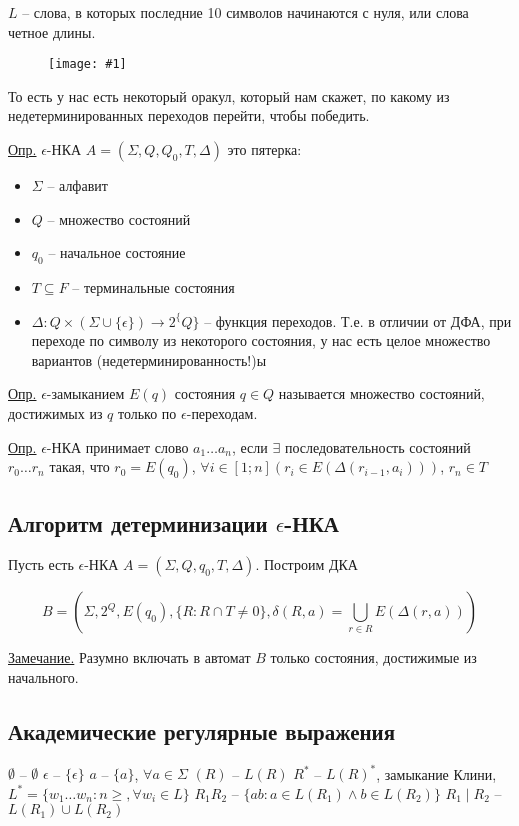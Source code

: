 \documentclass[fleqn, 12pt]{article}
\newcommand{\lr}[1]{\left({#1}\right)}
\newcommand{\image}[2] { \begin{figure}[h!] \centering	\texttt{[image: \#1]}  \end{figure} }
\begin{document}
$ L $ -- слова, в которых последние 10 символов начинаются с нуля, или слова четное длины.

\image{img7.png}{0.5}

То есть у нас есть некоторый оракул, который нам скажет, по какому из недетерминированных переходов перейти, чтобы победить. 

\underline{Опр.} $ \epsilon $-НКА $ A = (\Sigma, Q, Q_0, T, \Delta) $ это пятерка:

\begin{itemize}
	\item $ \Sigma $ -- алфавит
	
	\item $ Q $ -- множество состояний
	
	\item $q_0$ -- начальное состояние
	
	\item $ T \subseteq F $ -- терминальные состояния
	
	\item $ \Delta \colon Q \times (\Sigma \cup \{ \epsilon \}) \to 2^\{Q\} $ -- функция переходов. Т.е. в отличии от ДФА, при переходе по символу из некоторого состояния, у нас есть целое множество вариантов (недетерминированность!)ы
\end{itemize}

\underline{Опр.} $ \epsilon $-замыканием $ E(q) $ состояния $ q \in Q $ называется множество состояний, достижимых из $ q $ только по $ \epsilon $-переходам.

\underline{Опр.} $ \epsilon $-НКА принимает слово $ a_1 \ldots a_n $, если $ \exists $ последовательность состояний $ r_0 \ldots r_n $ такая, что $ r_0 = E(q_0) $, $ \forall i \in [1; n] \lr{r_i \in E(\Delta(r_{i - 1}, a_i))} $, $ r_n \in T $

\subsection{Алгоритм детерминизации $ \epsilon $-НКА}

Пусть есть $ \epsilon $-НКА $ A = (\Sigma, Q, q_0, T, \Delta) $. Построим ДКА 

$$ B = \lr{\Sigma, 2^{Q}, E(q_0), \{ R \colon R \cap T \neq 0 \}, \delta(R, a) = \bigcup \limits_{r \in R} E\lr{\Delta\lr{r, a}}} $$

\underline{Замечание.} Разумно включать в автомат $ B $ только состояния, достижимые из начального.

\subsection{Академические регулярные выражения}

$ \emptyset $ -- $ \emptyset $
$ \epsilon $ -- $ \{ \epsilon \} $
$ a $ -- $ \{ a \} $, $ \forall a \in \Sigma $
$ (R) $ -- $ L(R) $
$ R^* $ -- $ L(R)^* $, замыкание Клини, $ L^* = \{ w_1 \ldots w_n \colon n \geqslant, \forall w_i \in L \} $
$ R_1 R_2 $ -- $ \{ ab \colon a \in L(R_1) \land b \in L(R_2) \} $
$ R_1 \mid R_2 $ -- $ L(R_1) \cup L(R_2) $
\end{document}
